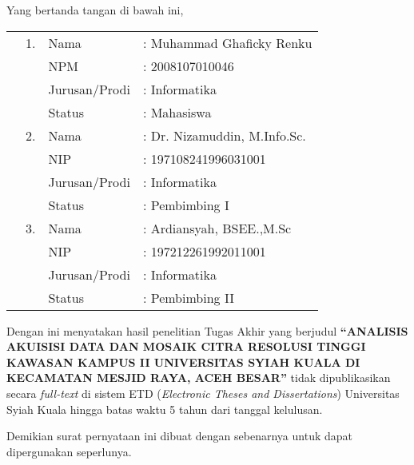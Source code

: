 \spernyataan %

\noindent
Yang bertanda tangan di bawah ini,
\vspace{-0.1cm}
\begin{table}[H]
{\renewcommand{\arraystretch}{0.7}
\begin{tabular}{M{0.6cm}lll}
	&1. 	& Nama   		&: Muhammad Ghaficky Renku \\
	&	& NPM       			&: 2008107010046   \\
	&	& Jurusan/Prodi   		&: Informatika \\
	&	& Status 				&: Mahasiswa \\  
	&2. 	& Nama  		&: Dr. Nizamuddin, M.Info.Sc. \\
	&	& NIP       			&: 197108241996031001   \\
	&	& Jurusan/Prodi   		&: Informatika \\
	&	& Status 				&: Pembimbing I \\  
	&3. 	& Nama  		&: Ardiansyah, BSEE.,M.Sc \\
	&	& NIP       			&: 197212261992011001   \\
	&	& Jurusan/Prodi   		&: Informatika \\
	&	& Status 				&: Pembimbing II   
\end{tabular}
}
\end{table}
\vspace{-0.4cm}
\noindent
Dengan ini menyatakan hasil penelitian Tugas Akhir yang berjudul \textbf{“ANALISIS AKUISISI DATA DAN MOSAIK  CITRA
RESOLUSI TINGGI KAWASAN KAMPUS II UNIVERSITAS
SYIAH KUALA DI KECAMATAN MESJID RAYA, ACEH BESAR”} tidak dipublikasikan secara \textit{full-text} di sistem ETD (\textit{Electronic Theses and Dissertations}) Universitas Syiah Kuala hingga batas waktu 5 tahun dari tanggal kelulusan.

\vspace{0.4cm}
\noindent
Demikian surat pernyataan ini dibuat dengan sebenarnya untuk dapat dipergunakan seperlunya.

